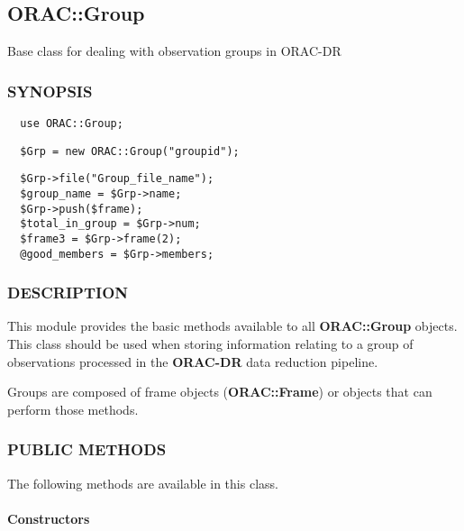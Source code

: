 \begin{description}
\subsection{ORAC::Group\label{ORAC::Group}}


Base class for dealing with observation groups in ORAC-DR

\subsubsection*{SYNOPSIS\label{ORAC::Group_SYNOPSIS}}
\begin{verbatim}
  use ORAC::Group;
\end{verbatim}
\begin{verbatim}
  $Grp = new ORAC::Group("groupid");
\end{verbatim}
\begin{verbatim}
  $Grp->file("Group_file_name");
  $group_name = $Grp->name;
  $Grp->push($frame);
  $total_in_group = $Grp->num;
  $frame3 = $Grp->frame(2);
  @good_members = $Grp->members;
\end{verbatim}
\subsubsection*{DESCRIPTION\label{ORAC::Group_DESCRIPTION}}


This module provides the basic methods available to all
\textbf{ORAC::Group} objects. This class should be used when 
storing information relating to a group of observations
processed in the \textbf{ORAC-DR} data reduction pipeline.



Groups are composed of frame objects (\textbf{ORAC::Frame})
or objects that can perform those methods.

\subsubsection*{PUBLIC METHODS\label{ORAC::Group_PUBLIC_METHODS}}


The following methods are available in this class.

\paragraph*{Constructors\label{ORAC::Group_Constructors}}



\end{description}
